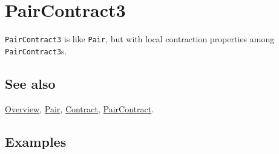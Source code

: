 \documentclass[../FeynCalcManual.tex]{subfiles}
\begin{document}
\hypertarget{paircontract3}{
\section{PairContract3}\label{paircontract3}}

\texttt{PairContract3} is like \texttt{Pair}, but with local contraction
properties among \texttt{PairContract3}s.

\subsection{See also}

\hyperlink{toc}{Overview}, \hyperlink{pair}{Pair},
\hyperlink{contract}{Contract}, \hyperlink{paircontract}{PairContract}.

\subsection{Examples}
\end{document}
